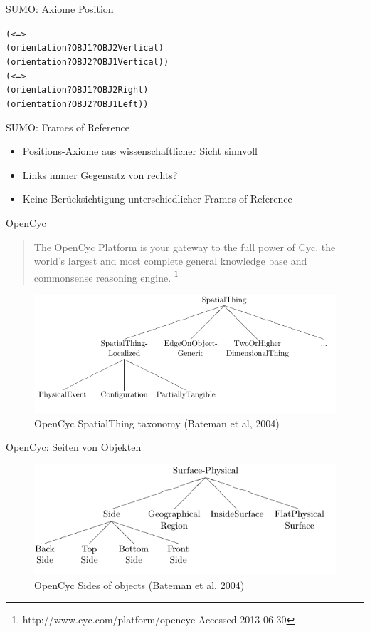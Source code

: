 \documentclass[12pt,a4paper]{beamer}
\begin{document}
\begin{frame}{SUMO: Axiome Position}
\begin{alltt}
(<=>
    (orientation ?OBJ1 ?OBJ2 Vertical)\\
    (orientation ?OBJ2 ?OBJ1 Vertical))\\
(<=>\\
    (orientation ?OBJ1 ?OBJ2 Right) \\
    (orientation ?OBJ2 ?OBJ1 Left))
\end{alltt}
\end{frame}



\begin{frame}{SUMO: Frames of Reference}
\begin{itemize}
\item Positions-Axiome aus wissenschaftlicher Sicht sinnvoll
\item Links immer Gegensatz von rechts?
\item Keine Berücksichtigung unterschiedlicher Frames of Reference
\end{itemize}
\end{frame}


\begin{frame}{OpenCyc}
\begin{quote}
The OpenCyc Platform is your gateway to the full power of Cyc, the world's largest and most complete general knowledge base and commonsense reasoning engine. \footnote{http://www.cyc.com/platform/opencyc Accessed 2013-06-30}
\end{quote}
\begin{figure}
\includegraphics[scale=0.45]{img/d2_opencyc_SpatialThing_taxonomy.png}
\caption{OpenCyc SpatialThing taxonomy (Bateman et al, 2004)}
\end{figure}
\end{frame}

\begin{frame}{OpenCyc: Seiten von Objekten }
\begin{figure}
\includegraphics[scale=0.45]{img/d2_opencyc_sides_of_objects.png}
\caption{OpenCyc Sides of objects (Bateman et al, 2004)}
\end{figure}
\end{frame}
\end{document}
